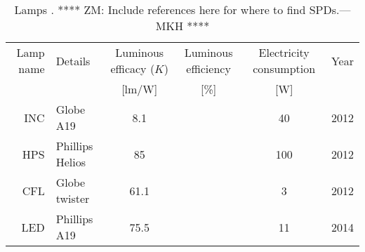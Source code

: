 

\begin{table}
\centering %
\caption{Lamps  \cite{aube2013}. **** ZM: Include references here for where to find SPDs.---MKH ****}
\begin{tabular}{r l c c c c}
  \toprule
  Lamp name 
      & Details 
      & Luminous efficacy ($K$) 
      & Luminous efficiency
      & Electricity consumption 
      & Year  \\
  
      &
      & [lm/W]
      & [\%]
      & [W] 
      & \\
  \midrule
  INC
      & Globe A19
      & 8.1
      &
      & 40
      & 2012\\
  HPS   
      & Phillips Helios
      & 85
      & 
      & 100
      & 2012 \\
  CFL
      & Globe twister
      & 61.1
      &  
      & 3
      & 2012 \\
  LED
      & Phillips A19
      & 75.5
      &  
      & 11
      & 2014 \\
  \bottomrule
\end{tabular}
\label{tab:lamps}
\end{table}

